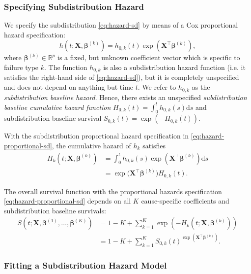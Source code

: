 \documentclass[11pt]{article}
\newcommand{\R}{\mathbb{R}}
\newcommand{\X}{\mathbf{X}}
\renewcommand{\b}{\bm{\beta}}
\renewcommand{\d}{\text{d}}
\begin{document}
\subsubsection{Specifying Subdistribution Hazard}
We specify the subdistribution \eqref{eq:hazard-sd} by means of a Cox proportional hazard specification:
\begin{equation} \label{eq:hazard-proportional-sd}
	h\left(t; \X, \b^{(k)}\right) = h_{0,k}(t) \exp\left( \X^\top \b^{(k)} \right),
\end{equation}
where $\b^{(k)}\in\R^p$ is a fixed, but unknown coefficient vector which is specific to failure type $k$. The function $h_{0,k}$ is also a subdistribution hazard function (i.e. it satisfies the right-hand side of \eqref{eq:hazard-sd}), but it is completely unspecified and does not depend on anything but time $t$. We refer to $h_{0,k}$ as the \textit{subdistribution baseline hazard}. Hence, there exists an unspecified \textit{subdistribution baseline cumulative hazard function} $H_{0,k}(t) = \int_0^t h_{0, k}(s) \d s$ and subdistribution baseline survival $S_{0,k}(t) = \exp(- H_{0,k}(t))$.

With the subdistribution proportional hazard specification in \eqref{eq:hazard-proportional-sd}, the cumulative hazard of $h_k$ satisfies
\begin{equation} \label{eq:cumulative-proporional-hazard-sd}
\begin{split}
    H_k\left(t ; \X, \b^{(k)}\right) &= \int^t_0 h_{0,k}(s) \exp \left(\X^\top \b^{(k)} \right) \d s
    \\
    &= \exp \big(\X^\top \b^{(k)} \big) H_{0,k}(t).
\end{split}
\end{equation}

The overall survival function with the proportional hazards specification \eqref{eq:hazard-proportional-sd} depends on all $K$ cause-specific coefficients and subdistribution baseline survivals:
\begin{equation}\label{eq:cox-survival-sd}
\begin{split}
	S\left( t ; \X, \b^{(1)}, \dots, \b^{(K)}\right)
	&=
	1 - K + \sum_{k=1}^K \exp\left( -H_k\left( t ; \X, \b^{(k)} \right) \right)
	\\
	&=
	1 - K + \sum_{k=1}^K S_{0,k}(t)^{\exp\left( \X^\top \b^{(k)} \right)}.
\end{split}
\end{equation}

\subsubsection{Fitting a Subdistribution Hazard Model}
\end{document}

